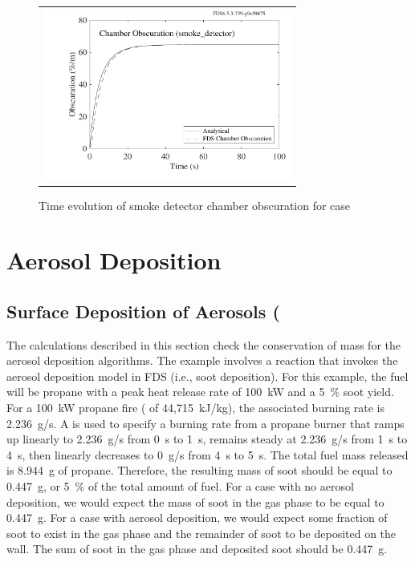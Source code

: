 \documentclass[11pt]{book}
\begin{document}
\begin{figure}[ht]
\begin{center}
\begin{tabular}{c}
\includegraphics[width=3.2in]{SCRIPT_FIGURES/smoke_detector}
\end{tabular}
\end{center}
\caption[Smoke detector chamber obscuration for  case]{Time evolution of smoke detector chamber obscuration for  case}
\label{fig:smoke_detector}
\end{figure}

\clearpage

\section{Aerosol Deposition}

\subsection{Surface Deposition of Aerosols (\texorpdfstring{})}

The calculations described in this section check the conservation of mass for the aerosol deposition algorithms. The example involves a reaction that invokes the aerosol deposition model in FDS (i.e., soot deposition). For this example, the fuel will be propane with a peak heat release rate of 100~kW and a 5~\% soot yield. For a 100~kW propane fire ( of 44,715~kJ/kg), the associated burning rate is 2.236~g/s. A  is used to specify a burning rate from a propane burner that ramps up linearly to 2.236~g/s from 0~s to 1~s, remains steady at 2.236~g/s from 1~s to 4~s, then linearly decreases to 0~g/s from 4~s to 5~s. The total fuel mass released is 8.944~g of propane. Therefore, the resulting mass of soot should be equal to 0.447~g, or 5~\% of the total amount of fuel. For a case with no aerosol deposition, we would expect the mass of soot in the gas phase to be equal to 0.447~g. For a case with aerosol deposition, we would expect some fraction of soot to exist in the gas phase and the remainder of soot to be deposited on the wall. The sum of soot in the gas phase and deposited soot should be 0.447~g.
\end{document}
